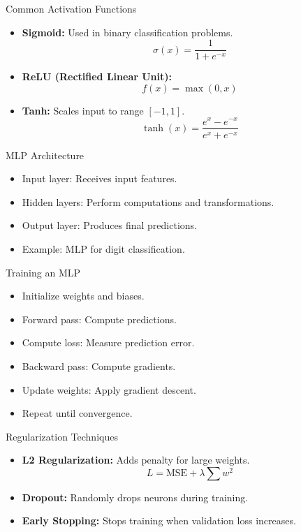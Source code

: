 \documentclass{beamer}
\begin{document}
\begin{frame}{Common Activation Functions}
    \begin{itemize}
        \item \textbf{Sigmoid:} Used in binary classification problems.
        \[
        \sigma(x) = \frac{1}{1 + e^{-x}}
        \]
        \item \textbf{ReLU (Rectified Linear Unit):}
        \[
        f(x) = \max(0, x)
        \]
        \item \textbf{Tanh:} Scales input to range \([-1, 1]\).
        \[
        \tanh(x) = \frac{e^x - e^{-x}}{e^x + e^{-x}}
        \]
    \end{itemize}
\end{frame}

\begin{frame}{MLP Architecture}
    \begin{itemize}
        \item Input layer: Receives input features.
        \item Hidden layers: Perform computations and transformations.
        \item Output layer: Produces final predictions.
        \item Example: MLP for digit classification.
    \end{itemize}
\end{frame}

\begin{frame}{Training an MLP}
    \begin{itemize}
        \item Initialize weights and biases.
        \item Forward pass: Compute predictions.
        \item Compute loss: Measure prediction error.
        \item Backward pass: Compute gradients.
        \item Update weights: Apply gradient descent.
        \item Repeat until convergence.
    \end{itemize}
\end{frame}

\begin{frame}{Regularization Techniques}
    \begin{itemize}
        \item \textbf{L2 Regularization:} Adds penalty for large weights.
        \[
        L = \text{MSE} + \lambda \sum w^2
        \]
        \item \textbf{Dropout:} Randomly drops neurons during training.
        \item \textbf{Early Stopping:} Stops training when validation loss increases.
    \end{itemize}
\end{frame}
\end{document}
